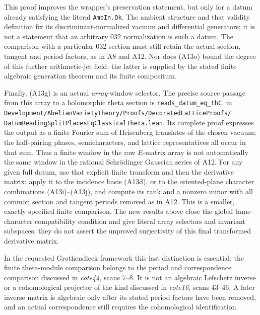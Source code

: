 This proof improves the wrapper's preservation statement,
but only for a datum already satisfying the literal
\texttt{AmbIn.Ok}.  The ambient structure and that validity definition fix its
discriminant-normalized vacuum and differential generators;
it is not a statement that an arbitrary 032 normalization
is such a datum.  The comparison with a particular 032
section must still retain the actual section, tangent
and period factors, as in A8 and A12.  Nor does (A13o)
bound the degree of this further arithmetic-jet field:
the latter is supplied by the stated finite algebraic
generation theorem and its finite compositum.

Finally, (A13g) is an actual \emph{array}-window selector.
The precise source passage from this array to a holomorphic
theta section is \texttt{reads\_datum\_eq\_thC}, in
\texttt{Development/AbelianVarietyTheory/Proofs/DecoratedLatticeProofs/}
\texttt{DatumReadingSplitPlacesEqClassicalTheta.lean}.
Its complete proof expresses the output as a finite
Fourier sum of Heisenberg translates of the chosen vacuum;
the half-pairing phases, semicharacters, and lattice
representatives all occur in that sum.  Thus a finite
window in the raw $E$-matrix array is not automatically
the same window in the rational Schr\"odinger Gaussian
series of A12.  For any given full datum, use that explicit
finite transform and then the derivative matrix: apply it
to the incidence basis (A13d), or to the oriented-plane
character combinations (A13i)--(A13j), and compute its rank
and a nonzero minor with all common section and tangent
periods removed as in A12.  This is a smaller, exactly
specified finite comparison.  The new results above close
the global tame-character compatibility condition and
give literal array selectors and invariant subspaces;
they do not assert the unproved surjectivity of this
final transformed derivative matrix.

In the requested Grothendieck framework this last distinction
is essential: the finite theta-module comparison belongs
to the period and correspondence comparison discussed in
\emph{cote44}, scans 7--8.  It is not an algebraic Lefschetz
inverse or a cohomological projector of the kind discussed
in \emph{cote16}, scans 43--46.  A later inverse matrix is
algebraic only after its stated period factors have been
removed, and an actual correspondence still requires the
cohomological identification.
